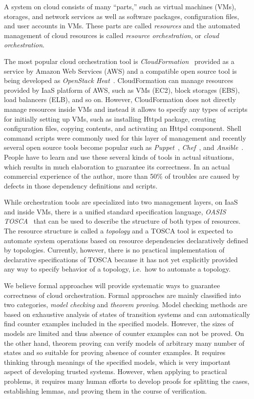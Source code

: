 \documentclass[12pt]{report}
\begin{document}
A system on cloud consists of many ``parts,'' such as virtual machines
(VMs), storages, and network services as well as software packages,
configuration files, and user accounts in VMs. These parts are called
{\it resources} and the automated management of cloud resources is
called {\it resource orchestration}, or {\it cloud orchestration}.

The most popular cloud orchestration tool is {\it
  CloudFormation}~\cite{CloudFormation} provided as a service by
Amazon Web Services (AWS) and a compatible open source tool is being
developed as {\it OpenStack Heat}~\cite{Heat}. CloudFormation can
manage resources provided by IaaS platform of AWS, such as VMs (EC2),
block storages (EBS), load balancers (ELB), and so on. However,
CloudFormation does not directly manage resources inside VMs and
instead it allows to specify any types of scripts for initially
setting up VMs, such as installing Httpd package, creating
configuration files, copying contents, and activating an Httpd
component. Shell command scripts were commonly used for this layer of
management and recently several open source tools become popular such
as {\it Puppet}~\cite{Puppet}, {\it Chef}~\cite{Chef}, and {\it
  Ansible}~\cite{Ansible}. People have to learn and use these
several kinds of tools in actual situations, which results in much
elaboration to guarantee its correctness. In an actual commercial
experience of the author, more than 50\% of troubles are caused by
defects in those dependency definitions and scripts.

While orchestration tools are specialized into two management layers,
on IaaS and inside VMs, there is a unified standard specification
language, {\it OASIS TOSCA}~\cite{TOSCA} that can be used to describe
the structure of both types of resources. The resource structure is
called a {\it topology} and a TOSCA tool is expected to automate
system operations based on resource dependencies declaratively defined
by topologies.  Currently, however, there is no practical
implementation of declarative specifications of TOSCA because it has
not yet explicitly provided any way to specify behavior of a topology,
i.e.\ how to automate a topology.

We believe formal approaches will provide systematic ways to guarantee
correctness of cloud orchestration. Formal approaches are mainly
classified into two categories, {\it model checking} and {\it theorem
  proving}. Model checking methods are based on exhaustive analysis of
states of transition systems and can automatically find counter
examples included in the specified models. However, the sizes of models
are limited and thus absence of counter examples can not be proved.
On the other hand, theorem proving can verify models of arbitrary many
number of states and so suitable for proving absence of counter
examples. It requires thinking through meanings of the specified
models, which is very important aspect of developing trusted
systems. However, when applying to practical problems, it requires many
human efforts to develop proofs for splitting the cases, establishing
lemmas, and proving them in the course of verification.
\end{document}
